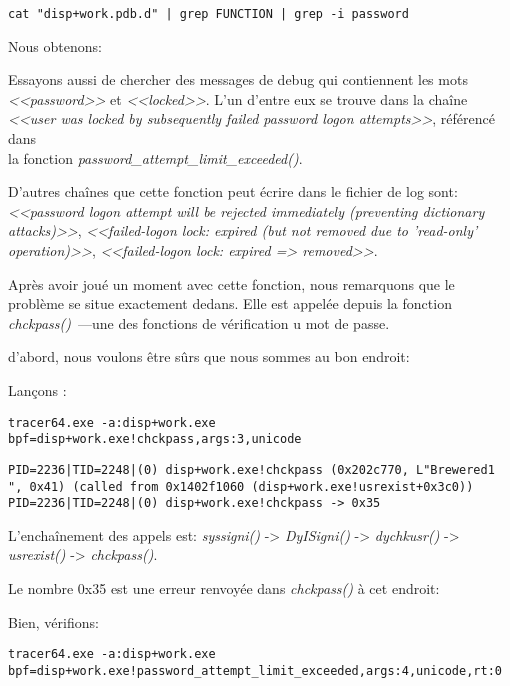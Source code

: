 \begin{lstlisting}
cat "disp+work.pdb.d" | grep FUNCTION | grep -i password
\end{lstlisting}

Nous obtenons:



Essayons aussi de chercher des messages de debug qui contiennent les mots \emph{<<password>>}
et \emph{<<locked>>}.
L'un d'entre eux se trouve dans la chaîne \emph{<<user was locked by subsequently
failed password logon attempts>>}, référencé dans\\
la fonction \emph{password\_attempt\_limit\_exceeded()}.

D'autres chaînes que cette fonction peut écrire dans le fichier de log sont:
\emph{<<password logon attempt will be rejected immediately (preventing dictionary attacks)>>},
\emph{<<failed-logon lock: expired (but not removed due to 'read-only' operation)>>},
\emph{<<failed-logon lock: expired => removed>>}.

Après avoir joué un moment avec cette fonction, nous remarquons que le problème se
situe exactement dedans.
Elle est appelée depuis la fonction \emph{chckpass()}~---une des fonctions de vérification
u mot de passe.

d'abord, nous voulons être sûrs que nous sommes au bon endroit:

Lançons \tracer:

\begin{lstlisting}
tracer64.exe -a:disp+work.exe bpf=disp+work.exe!chckpass,args:3,unicode
\end{lstlisting}

\begin{lstlisting}
PID=2236|TID=2248|(0) disp+work.exe!chckpass (0x202c770, L"Brewered1                               ", 0x41) (called from 0x1402f1060 (disp+work.exe!usrexist+0x3c0))
PID=2236|TID=2248|(0) disp+work.exe!chckpass -> 0x35
\end{lstlisting}

L'enchaînement des appels est: \emph{syssigni()} -> \emph{DyISigni()} -> \emph{dychkusr()} -> \emph{usrexist()} -> \emph{chckpass()}.

Le nombre 0x35 est une erreur renvoyée dans \emph{chckpass()} à cet endroit:



Bien, vérifions:

\begin{lstlisting}
tracer64.exe -a:disp+work.exe bpf=disp+work.exe!password_attempt_limit_exceeded,args:4,unicode,rt:0
\end{lstlisting}

